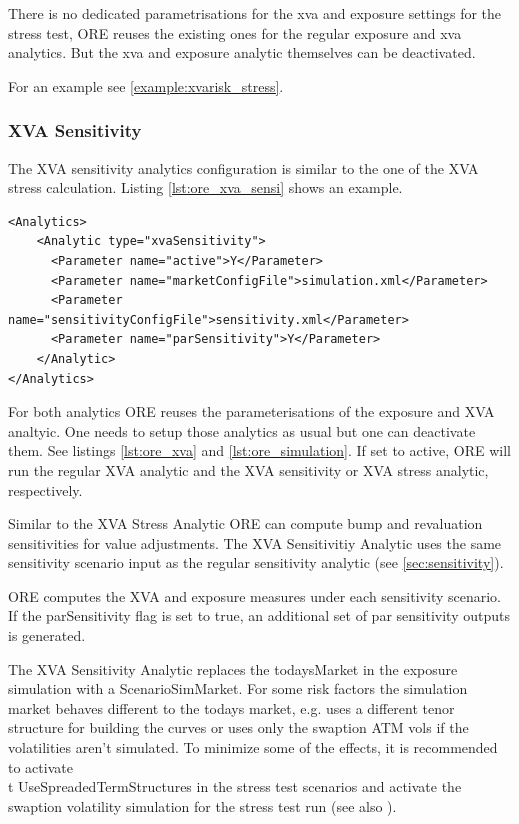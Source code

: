 There is no dedicated parametrisations for the xva and exposure settings for the stress test, ORE reuses the existing
ones for the regular exposure and xva analytics. But the xva and exposure analytic themselves can be deactivated.

For an example see \ref{example:xvarisk_stress}.

\subsubsection{XVA Sensitivity}

The XVA sensitivity analytics configuration is similar to the one of the XVA stress calculation. Listing \ref{lst:ore_xva_sensi}
shows an example.

\begin{listing}[H]
\begin{verbatim}
<Analytics>
    <Analytic type="xvaSensitivity">
      <Parameter name="active">Y</Parameter>
      <Parameter name="marketConfigFile">simulation.xml</Parameter>
      <Parameter name="sensitivityConfigFile">sensitivity.xml</Parameter>
      <Parameter name="parSensitivity">Y</Parameter>
    </Analytic>
</Analytics>
\end{verbatim}
\caption{ORE analytic: XVA Sensitivity}
\label{lst:ore_xva_sensi}
\end{listing}

For both analytics ORE reuses the parameterisations of the exposure and XVA analtyic. One needs to setup those
analytics as usual but one can deactivate them. See listings \ref{lst:ore_xva} and \ref{lst:ore_simulation}.
If set to active, ORE will run the regular XVA analytic and the XVA sensitivity or XVA stress analytic, respectively.

Similar to the XVA Stress Analytic ORE can compute bump and revaluation sensitivities for value adjustments.
The XVA Sensitivitiy Analytic uses the same sensitivity scenario input as the regular sensitivity analytic
(see \ref{sec:sensitivity}).

ORE computes the XVA and exposure measures under each sensitivity scenario. If the parSensitivity flag is set to true,
an additional set of par sensitivity outputs is generated.

The XVA Sensitivity Analytic replaces the todaysMarket in the exposure simulation with a ScenarioSimMarket.
For some risk factors the simulation market behaves different to the todays market, e.g. uses a different tenor
structure for building the curves or uses only the swaption ATM vols if  the volatilities aren't simulated.
To minimize some of the effects, it is recommended to activate {\\t UseSpreadedTermStructures} in the stress test
scenarios  and activate the swaption volatility simulation for the stress test run (see also \cite{methods}).

